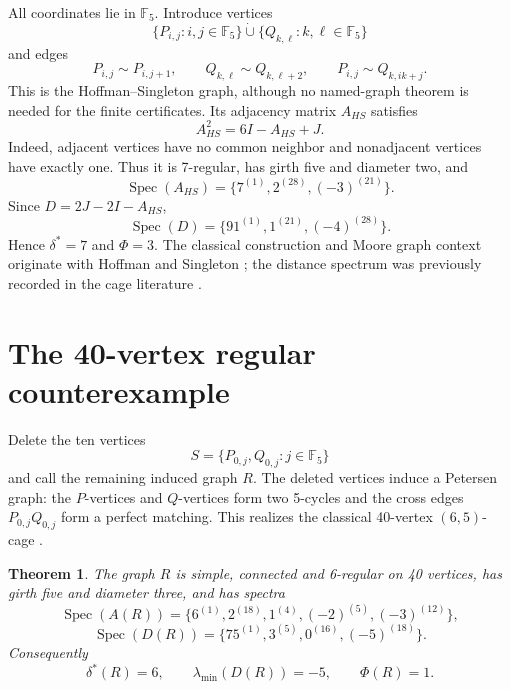 \documentclass[11pt,reqno]{amsart}
\newcommand{\F}{\mathbb F_5}
\newcommand{\Spec}{\operatorname{Spec}}
\newcommand{\PhiScore}{\Phi}
\theoremstyle{plain}
\newtheorem{theorem}{Theorem}[section]
\theoremstyle{definition}
\theoremstyle{remark}
\begin{document}
All coordinates lie in $\F$.  Introduce vertices
\[
 \{P_{i,j}:i,j\in\F\}\mathbin{\dot\cup}
 \{Q_{k,\ell}:k,\ell\in\F\}
\]
and edges
\[
 P_{i,j}\sim P_{i,j+1},\qquad
 Q_{k,\ell}\sim Q_{k,\ell+2},\qquad
 P_{i,j}\sim Q_{k,ik+j}.
\]
This is the Hoffman--Singleton graph, although no named-graph theorem is
needed for the finite certificates.  Its adjacency matrix $A_{HS}$ satisfies
\begin{equation}\label{eq:HS-square}
 A_{HS}^2=6I-A_{HS}+J.
\end{equation}
Indeed, adjacent vertices have no common neighbor and nonadjacent vertices
have exactly one.  Thus it is 7-regular, has girth five and diameter two, and
\[
 \Spec(A_{HS})=\{7^{(1)},2^{(28)},(-3)^{(21)}\}.
\]
Since $D=2J-2I-A_{HS}$,
\[
 \Spec(D)=\{91^{(1)},1^{(21)},(-4)^{(28)}\}.
\]
Hence $\delta^*=7$ and $\PhiScore=3$.  The classical construction and Moore
graph context originate with Hoffman and Singleton
\cite{HoffmanSingleton1960}; the distance spectrum was previously recorded
in the cage literature \cite{HowladerPanigrahi2022}.

\section{The 40-vertex regular counterexample}

Delete the ten vertices
\[
 S=\{P_{0,j},Q_{0,j}:j\in\F\}
\]
and call the remaining induced graph $R$.  The deleted vertices induce a
Petersen graph: the $P$-vertices and $Q$-vertices form two 5-cycles and the
cross edges $P_{0,j}Q_{0,j}$ form a perfect matching.  This realizes the
classical 40-vertex $(6,5)$-cage
\cite{OKeefeWong1979,Wong1979,ExooJajcay2013,KlinMuzychukZivAv2009}.

\begin{theorem}\label{thm:R40}
The graph $R$ is simple, connected and 6-regular on 40 vertices, has girth
five and diameter three, and has spectra
\[
 \Spec(A(R))=
 \{6^{(1)},2^{(18)},1^{(4)},(-2)^{(5)},(-3)^{(12)}\},
\]
\[
 \Spec(D(R))=
 \{75^{(1)},3^{(5)},0^{(16)},(-5)^{(18)}\}.
\]
Consequently
\[
 \delta^*(R)=6,
 \qquad
 \lambda_{\min}(D(R))=-5,
 \qquad
 \PhiScore(R)=1.
\]
\end{theorem}
\end{document}
